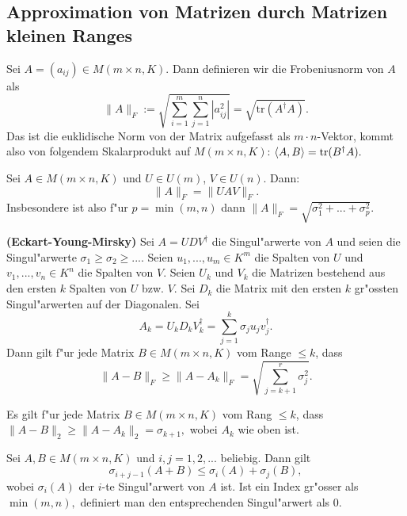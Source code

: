 \documentclass[8pt, a4paper, twocolumn, landscape]{article}
\begin{document}
{%

\subsection{Approximation von Matrizen durch Matrizen kleinen Ranges}
\begin{definition}
Sei $A = (a_{ij}) \in M( m \times n, K)$. Dann definieren wir die Frobeniusnorm von $A$ als
$$
\|A\|_F := \sqrt{\sum\limits_{i = 1}^m \sum\limits_{j = 1}^n |a_{ij}^2|} = \sqrt{\mathrm{tr}(A^\dagger A)}.
$$
Das ist die euklidische Norm von der Matrix aufgefasst als $m \cdot n$-Vektor, kommt also von folgendem Skalarprodukt auf $M(m \times n, K)$:
$
\left\langle {A} , {B} \right\rangle = \mathrm{tr}(B^\dagger A).
$
\end{definition}



\begin{lemma}
Sei $A \in M( m \times n, K)$ und $U \in U(m)$, $V \in U(n)$. Dann:
$$
\| A \|_F = \|UAV\|_F.
$$
Insbesondere ist also f"ur $p = \min(m, n)$ dann
$
\|A\|_F =  \sqrt{\sigma_1^2 + ... + \sigma_p^2}.
$
\end{lemma}

\begin{theorem} \textbf{(Eckart-Young-Mirsky)} Sei $A = UDV^\dagger$ die Singul"arwerte von $A$ und seien die Singul"arwerte $\sigma_1 \geq  \sigma_2 \geq...$. Seien $u_1, ..., u_m \in K^m$ die Spalten von $U$ und $v_1, ..., v_n \in K^n$ die Spalten von $V$. Seien $U_k$ und $V_k$ die Matrizen bestehend aus den ersten $k$ Spalten von $U$ bzw. $V$. Sei $D_k$ die Matrix mit den ersten $k$ gr"ossten Singul"arwerten auf der Diagonalen. Sei 
$$
A_k = U_k D_k V_k^\dagger = \sum\limits_{j = 1}^k \sigma_j u_j v_j^\dagger.
$$
Dann gilt f"ur jede Matrix $B \in M( m \times n, K)$ vom Range $\leq k$, dass
$$
\|A - B\|_F \geq \|A - A_k \|_F = \sqrt{\sum\limits_{j = k+1}^r \sigma_j^2}.
$$
\end{theorem}

\begin{remark}
Es gilt f"ur jede Matrix $B \in M( m \times n, K)$ vom Rang $\leq k$, dass \\
$
\|A - B\|_2 \geq \|A - A_k \|_2 = \sigma_{k+1},
$
wobei $A_k$ wie oben ist.
\end{remark}

\begin{corollary}
Sei $A, B \in M(m \times n, K)$ und $i, j = 1, 2, ...$ beliebig. Dann gilt
$$
\sigma_{i+j-1} (A+B) \leq \sigma_i(A) + \sigma_j(B), 
$$
wobei $ \sigma_i(A)$ der $i$-te Singul"arwert von $A$ ist. Ist ein Index gr"osser als $\min(m, n),$ definiert man den entsprechenden Singul"arwert als $0$.
\end{corollary}

}
\end{document}
